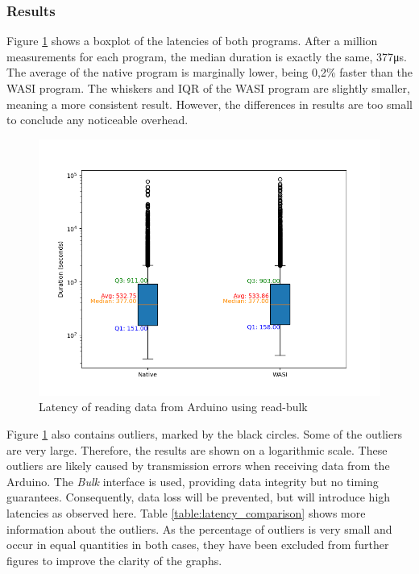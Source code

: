 \subsubsection{Results}
Figure \ref{fig:arduino_reading_latency_boxplot} shows a boxplot of the latencies of both programs. After a million measurements for each program, the median duration is exactly the same, 377μs. The average of the native program is marginally lower, being 0,2\% faster than the \acrshort{WASI} program. The whiskers and IQR of the \acrshort{WASI} program are slightly smaller, meaning a more consistent result. However, the differences in results are too small to conclude any noticeable overhead.

\begin{figure}[H]
  \centering
  \includegraphics[width=1\textwidth]{images/arduino_latency_boxplot.png}
  \caption{Latency of reading data from Arduino using read-bulk}
  \label{fig:arduino_reading_latency_boxplot}
\end{figure}


Figure \ref{fig:arduino_reading_latency_boxplot} also contains outliers, marked by the black circles. Some of the outliers are very large. Therefore, the results are shown on a logarithmic scale. These outliers are likely caused by transmission errors when receiving data from the Arduino. The \textit{Bulk} interface is used, providing data integrity but no timing guarantees. Consequently, data loss will be prevented, but will introduce high latencies as observed here. Table \ref{table:latency_comparison} shows more information about the outliers. As the percentage of outliers is very small and occur in equal quantities in both cases, they have been excluded from further figures to improve the clarity of the graphs.

